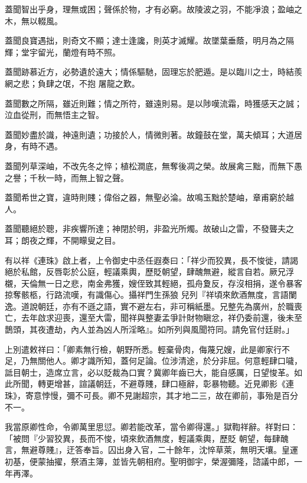 \begin{pinyinscope}
 蓋聞智出乎身，理無或困；聲係於物，才有必窮。故陵波之羽，不能凈浪；盈岫之木，無以輟風。



 蓋聞良寶遇拙，則奇文不顯；達士逢讒，則英才滅耀。故墜葉垂蔭，明月為之隔輝；堂宇留光，蘭燈有時不照。



 蓋聞跡慕近方，必勢遺於遠大；情係驅馳，固理忘於肥遁。是以臨川之士，時結羨網之悲；負肆之氓，不抱
 屠龍之歎。



 蓋聞數之所隔，雖近則難；情之所符，雖遠則易。是以陟嘆流霜，時獲感天之誠；泣血從刑，而無悟主之智。



 蓋聞妙盡於識，神遠則遺；功接於人，情微則著。故鐘鼓在堂，萬夫傾耳；大道居身，有時不遇。



 蓋聞列草深岫，不改先冬之悴；植松澗底，無奪後凋之榮。故展禽三黜，而無下愚之譽；千秋一時，而無上智之聲。



 蓋聞希世之寶，違時則賤；偉俗之器，無聖必淪。故鳴玉黜於楚岫，章甫窮於越人。



 蓋聞聽絕於聰，非疾響所達；神閉於明，非盈光所燭。故破山之雷，不發聾夫之耳；朗夜之輝，不開矇叟之目。



 有以祥《連珠》啟上者，上令御史中丞任遐奏曰：「祥少而狡異，長不悛徙，請謁絕於私館，反唇彰於公庭，輕議乘輿，歷貶朝望，肆醜無避，縱言自若。厥兄浮櫬，天倫無一日之悲，南金弗獲，嫂侄致其輕絕，孤舟夐反，存沒相捐，遂令暴客掠奪骸柩，行路流嘆，有識傷心。攝祥門生孫狼
 兒列『祥頃來飲酒無度，言語闌逸。道說朝廷，亦有不遜之語，實不避左右，非可稱紙墨。兄整先為廣州，於職喪亡，去年啟求迎喪，還至大雷，聞祥與整妻孟爭計財物瞋忿，祥仍委前還，後未至鵲頭，其夜遭劫，內人並為凶人所淫略』。如所列與風聞符同。請免官付廷尉。」



 上別遣敕祥曰：「卿素無行檢，朝野所悉。輕棄骨肉，侮蔑兄嫂，此是卿家行不足，乃無關他人。卿才識所知，蓋何足論。位涉清途，於分非屈。何意輕肆口噦，詆目朝士，造席立言，必以貶裁為口實？冀卿年齒已大，能自感厲，日望悛革。如此所聞，轉更增甚，諠議朝廷，不避尊賤，肆口極辭，彰暴物聽。近見卿影《連珠》，寄意悖慢，彌不可長。卿不見謝超宗，其才地二三，故在卿前，事殆是百分不一。



 我當原卿性命，令卿萬里思愆。卿若能改革，當令卿得還。」獄鞫祥辭。祥對曰：「被問『少習狡異，長而不悛，頃來飲酒無度，輕議乘輿，歷貶
 朝望，每肆醜言，無避尊賤』，迂答奉旨。囚出身入官，二十餘年，沈悴草萊，無明天壤。皇運初基，便蒙抽擢，祭酒主簿，並皆先朝相府。聖明御宇，榮渥彌隆，諮議中郎，一年再澤。




\end{pinyinscope}
